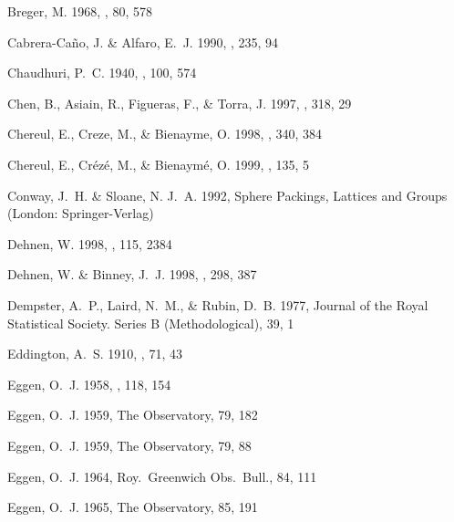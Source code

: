 \begin{thebibliography}{99}
{Breger}, M. 1968, \pasp, 80, 578

{Cabrera-Ca\~{n}o}, J. \& {Alfaro}, E.~J. 1990, \aap, 235, 94

{Chaudhuri}, P.~C. 1940, \mnras, 100, 574

{Chen}, B., {Asiain}, R., {Figueras}, F., \& {Torra}, J. 1997, \aap, 318, 29

{Chereul}, E., {Creze}, M., \& {Bienayme}, O. 1998, \aap, 340, 384

{Chereul}, E., {Cr{\'e}z{\'e}}, M., \& {Bienaym{\'e}}, O. 1999, \aaps, 135, 5

{Conway}, J.~H. \& {Sloane}, N. J.~A. 1992, {Sphere Packings, Lattices and
  Groups} (London: {Springer-Verlag})

{Dehnen}, W. 1998, \aj, 115, 2384

{Dehnen}, W. \& {Binney}, J.~J. 1998, \mnras, 298, 387

{Dempster}, A.~P., {Laird}, N.~M., \& {Rubin}, D.~B. 1977, Journal of the Royal
  Statistical Society. Series B (Methodological), 39, 1

{Eddington}, A.~S. 1910, \mnras, 71, 43

{Eggen}, O.~J. 1958, \mnras, 118, 154

{Eggen}, O.~J. 1959{}, The Observatory, 79, 182

{Eggen}, O.~J. 1959{}, The Observatory, 79, 88

{Eggen}, O.~J. 1964, Roy.~Greenwich Obs.~Bull., 84, 111

{Eggen}, O.~J. 1965, The Observatory, 85, 191


\end{thebibliography}

